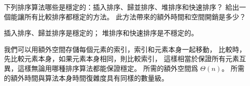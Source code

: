 \startEXERCISE
下列排序算法哪些是穩定的：插入排序、歸並排序、堆排序和快速排序？
給出一個能讓所有比較排序都穩定的方法。
此方法帶來的額外時間和空間開銷是多少？
\stopEXERCISE

\startANSWER
插入排序、歸並排序是穩定的； 堆排序和快速排序是不穩定的。

我們可以用額外空間存儲每個元素的索引，索引和元素本身一起移動，
比較時，先比較元素本身，如果元素本身相同，則比較索引，
這樣相當於保證所有元素互異，這樣無論用哪種排序算法都能保證穩定。
所需的額外空間爲 $\Theta(n)$。
所需的額外時間與算法本身時間復雜度具有同樣的數量級。
\stopANSWER
